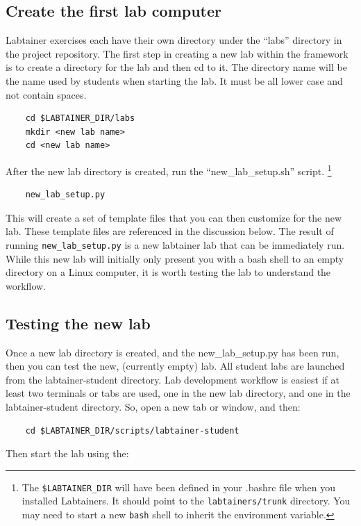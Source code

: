 \documentclass[12pt]{article}
\begin{document}
\subsection{Create the first lab computer}
Labtainer exercises each have their own
directory under the ``labs'' directory in the project repository.
The first step in creating a new lab within the framework is to create
a directory for the lab and then cd to it.  The directory name will be the name
used by students when starting the lab.  It must be all lower case and not contain spaces.
\begin{verbatim}
    cd $LABTAINER_DIR/labs
    mkdir <new lab name>
    cd <new lab name>
\end{verbatim}

\noindent After the new lab directory is created, run the ``new\_lab\_setup.sh'' script.
\footnote {The {\tt \$LABTAINER\_DIR} will have been defined in your .bashrc
file when you installed Labtainers.  It should point to the {\tt labtainers/trunk}
directory.  You may need to start a new {\tt bash} shell to inherit the environment
variable.}

\begin{verbatim}
    new_lab_setup.py
\end{verbatim}
This will create a set of template files that you can then customize
for the new lab.  These template files are referenced in the discussion
below.
The result of running {\tt new\_lab\_setup.py} is a new labtainer lab that can be immediately run.  
While this new lab will initially only present you with a bash shell to an
empty directory on a Linux computer, it is worth testing the lab to understand the workflow.

\subsection{Testing the new lab}
Once a new lab directory is created, and the new\_lab\_setup.py has been run, then 
you can test the new, (currently empty) lab.  All student labs are launched from the
labtainer-student directory.  Lab development workflow is easiest if at least two
terminals or tabs are used, one in the new lab directory, and one in the labtainer-student
directory.  So, open a new tab or window, and then:

\begin{verbatim}
    cd $LABTAINER_DIR/scripts/labtainer-student
\end{verbatim}
Then start the lab using the:
\end{document}
